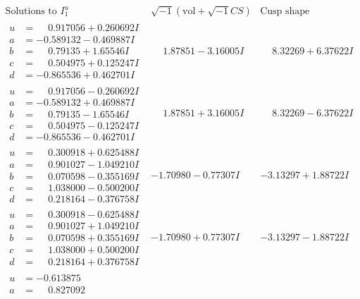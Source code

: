 \documentclass[1p]{elsarticle_modified}
\theoremstyle{definition}
\newcommand{\I}{\sqrt{-1}}
\begin{document}
$$\begin{array}{c|c|c}  
\text{Solutions to }I^u_{1}& \I (\text{vol} + \sqrt{-1}CS) & \text{Cusp shape}\\
 \hline 
\begin{aligned}
u &= \phantom{-}0.917056 + 0.260692 I \\
a &= -0.589132 - 0.469887 I \\
b &= \phantom{-}0.79135 + 1.65546 I \\
c &= \phantom{-}0.504975 + 0.125247 I \\
d &= -0.865536 + 0.462701 I\end{aligned}
 & \phantom{-}1.87851 - 3.16005 I & \phantom{-}8.32269 + 6.37622 I \\ \hline\begin{aligned}
u &= \phantom{-}0.917056 - 0.260692 I \\
a &= -0.589132 + 0.469887 I \\
b &= \phantom{-}0.79135 - 1.65546 I \\
c &= \phantom{-}0.504975 - 0.125247 I \\
d &= -0.865536 - 0.462701 I\end{aligned}
 & \phantom{-}1.87851 + 3.16005 I & \phantom{-}8.32269 - 6.37622 I \\ \hline\begin{aligned}
u &= \phantom{-}0.300918 + 0.625488 I \\
a &= \phantom{-}0.901027 - 1.049210 I \\
b &= \phantom{-}0.070598 - 0.355169 I \\
c &= \phantom{-}1.038000 - 0.500200 I \\
d &= \phantom{-}0.218164 - 0.376758 I\end{aligned}
 & -1.70980 - 0.77307 I & -3.13297 + 1.88722 I \\ \hline\begin{aligned}
u &= \phantom{-}0.300918 - 0.625488 I \\
a &= \phantom{-}0.901027 + 1.049210 I \\
b &= \phantom{-}0.070598 + 0.355169 I \\
c &= \phantom{-}1.038000 + 0.500200 I \\
d &= \phantom{-}0.218164 + 0.376758 I\end{aligned}
 & -1.70980 + 0.77307 I & -3.13297 - 1.88722 I \\ \hline\begin{aligned}
u &= -0.613875\phantom{ +0.000000I} \\
a &= \phantom{-}0.827092\phantom{ +0.000000I} \\

\end{aligned}
\end{array}$$
\end{document}
